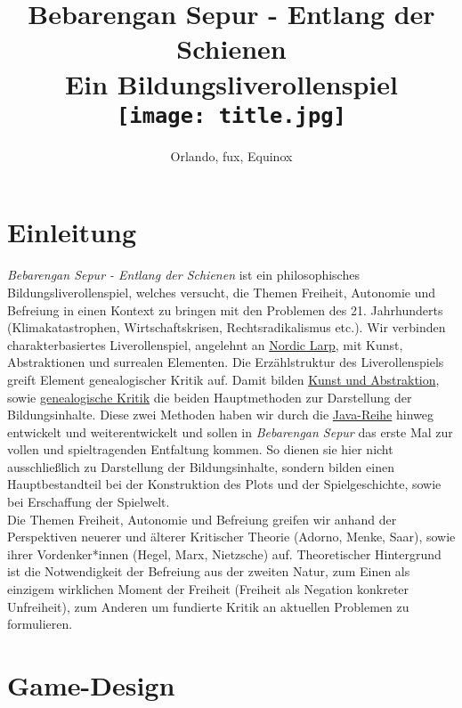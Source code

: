 \documentclass[12pt, a4paper, openany]{report}
\title{
    {Bebarengan Sepur - Entlang der Schienen}\\
    {\large{Ein Bildungsliverollenspiel}}\\
    {\bigskip}
    {\texttt{[image: title.jpg]}}\\
}
\author{Orlando, fux, Equinox}
\begin{document}
\maketitle
\frontmatter
\tableofcontents
\mainmatter

\chapter{Einleitung}
\textit{Bebarengan Sepur - Entlang der Schienen} ist ein philosophisches Bildungsliverollenspiel, welches versucht, die Themen Freiheit, Autonomie und Befreiung in einen Kontext zu bringen mit den Problemen des 21. Jahrhunderts (Klimakatastrophen, Wirtschaftskrisen, Rechtsradikalismus etc.). 
Wir verbinden charakterbasiertes Liverollenspiel, angelehnt an \hyperref[nordic-larp]{Nordic Larp}, mit Kunst, Abstraktionen und surrealen Elementen. 
Die Erzählstruktur des Liverollenspiels greift Element genealogischer Kritik auf. 
Damit bilden \hyperref[kunst-abstraktion]{Kunst und Abstraktion}, sowie \hyperref[genealogische-kritik]{genealogische Kritik} die beiden Hauptmethoden zur Darstellung der Bildungsinhalte. 
Diese zwei Methoden haben wir durch die \hyperref[java-reihe]{Java-Reihe} hinweg entwickelt und weiterentwickelt und sollen in \textit{Bebarengan Sepur} das erste Mal zur vollen und spieltragenden Entfaltung kommen. 
So dienen sie hier nicht ausschließlich zu Darstellung der Bildungsinhalte, sondern bilden einen Hauptbestandteil bei der Konstruktion des Plots und der Spielgeschichte, sowie bei Erschaffung der Spielwelt.\\
Die Themen Freiheit, Autonomie und Befreiung greifen wir anhand der Perspektiven neuerer und älterer Kritischer Theorie (Adorno, Menke, Saar), sowie ihrer Vordenker*innen (Hegel, Marx, Nietzsche) auf. 
Theoretischer Hintergrund ist die Notwendigkeit der Befreiung aus der zweiten Natur, zum Einen als einzigem wirklichen Moment der Freiheit (Freiheit als Negation konkreter Unfreiheit), zum Anderen um fundierte Kritik an aktuellen Problemen zu formulieren.

\chapter{Game-Design}
\end{document}
